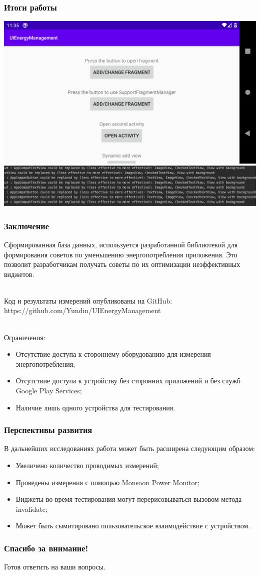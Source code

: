 \documentclass{beamer}
\begin{document}
    \begin{frame}
        \frametitle{Итоги работы}
        \centering
        \includegraphics[width=0.8\linewidth]{example}
        \includegraphics[width=\linewidth]{example_log}
    \end{frame}
    \begin{frame}
        \frametitle{Заключение}
        Сформированная база данных, используется разработанной библиотекой для формирования советов по уменьшению энергопотребления приложения. Это позволит разработчикам получать советы по их оптимизации неэффективных виджетов.\\~
        
        Код и результаты измерений опубликованы на GitHub: https://github.com/Yundin/UIEnergyManagement\\~

        Ограничения:
        \begin{itemize}
            \item Отсутствие доступа к стороннему оборудованию для измерения энергопотребления;
            \item Отсутствие доступа к устройству без сторонних приложений и без служб Google Play Services;
            \item Наличие лишь одного устройства для тестирования.
        \end{itemize}
    \end{frame}
    \begin{frame}
        \frametitle{Перспективы развития}
        В дальнейших исследованиях работа может быть расширена следующим образом:
        \begin{itemize}
            \item Увеличено количество проводимых измерений; 
            \item Проведены измерения с помощью Monsoon Power Monitor;
            \item Виджеты во время тестирования могут перерисовываться вызовом метода invalidate;
            \item Может быть сымитировано пользовательское взаимодействие с устройством.
        \end{itemize}
    \end{frame}
    \begin{frame}[c]
        \begin{center}
            \frametitle{\LARGE Спасибо за внимание!}

            { \LARGE Готов ответить на ваши вопросы. }
        \end{center}
    \end{frame}
\end{document}
